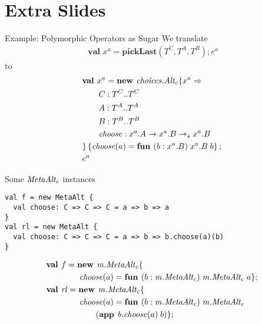 \documentclass{beamer}
\begin{document}
\section{Extra Slides}


\begin{frame}[fragile]{Example: Polymorphic Operators as Sugar}
We translate
\begin{align*}
\textbf{val } x^a = \textbf{pickLast}(T^C, T^A, T^B); e^a
\end{align*}
to
\begin{align*}
&\textbf{val }x^a = \textbf{new }\mathit{choices.Alt_c} \{x^a \Rightarrow \\
&\quad\quad C : T^C..T^C\\
&\quad\quad A : T^A..T^A\\
&\quad\quad B : T^B..T^B\\
&\quad\quad\mathit{choose} : x^a.A \rightarrow x^a.B\rightarrow_sx^a.B\\
& \}\left\{\mathit{choose}(a)=\textbf{fun } (b:x^a.B)\;x^a.B\;b\right\} ;\;\\&e^a
\end{align*}
\end{frame}

\begin{frame}[fragile]{Some ${\mathit{MetaAlt_c}}$ instances}
\begin{verbatim}
val f = new MetaAlt {
  val choose: C => C => C = a => b => a
}
val rl = new MetaAlt {
  val choose: C => C => C = a => b => b.choose(a)(b)
}
\end{verbatim}
\begin{align*}
&\mlnew f {{\mi{m.MetaAlt_c}}\mlldefs{\\
&\gap\gap\mi{choose}(a)=\fun b {\mi{m.MetaAlt_c}} {\mi{m.MetaAlt_c}} a}}{
\mlnew {\mi{rl}} {{\mi{m.MetaAlt_c}}\mlldefs{\\
&\gap\gap\mi{choose}(a)=\fun b {\mi{m.MetaAlt_c}} {\mi{m.MetaAlt_c}} {\\
&\gap\gap\gap \app {{\mi{b.choose}}(a)} b}}}{
}}
\end{align*}
\end{frame}
\end{document}

